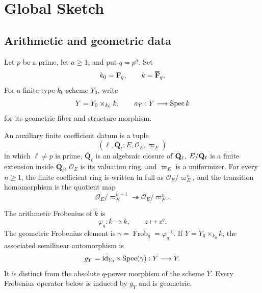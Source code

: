 \newcommand{\Fbar}{\overline{\mathbf F}_q}
\newcommand{\Qlb}{\overline{\mathbf Q}_\ell}
\newcommand{\Zl}{\mathbf Z_\ell}
\newcommand{\RGamma}{R\Gamma}
\newcommand{\RGammac}{R\Gamma_c}
\newcommand{\Sh}{\operatorname{Sh}}
\newcommand{\Kar}{\operatorname{Kar}}
\newcommand{\Wt}{\operatorname{Wt}}

\chapter{Global Sketch}

\section{Arithmetic and geometric data}

\begin{definition}
\label{def:weil-base-field}


Let \(p\) be a prime, let \(a\geq1\), and put \(q=p^a\).  Set
\[
 k_0=\Fq,
 \qquad
 k=\Fbar,
\]
For a finite-type \(k_0\)-scheme \(Y_0\),
write
\[
 Y=Y_0\times_{k_0}k,
 \qquad
 a_Y:Y\longrightarrow\operatorname{Spec} k
\]
for its geometric fiber and structure morphism.
\end{definition}


\begin{definition}
\label{def:weil-finite-coefficient-datum}


An auxiliary finite coefficient datum is a tuple
\[
 (\ell,\Qlb;E,\mathcal O_E,\varpi_E)
\]
in which \(\ell\neq p\) is prime, \(\Qlb\) is an algebraic closure of
\(\mathbf Q_{\ell}\), \(E/\mathbf Q_{\ell}\) is a finite extension inside \(\Qlb\),
\(\mathcal O_E\) is its valuation ring, and \(\varpi_E\) is a uniformizer.
For every \(n\geq1\),
the finite coefficient ring is written in full as
\(\mathcal O_E/\varpi_E^n\), and the transition homomorphism is the quotient
map
\[
 \mathcal O_E/\varpi_E^{n+1}\twoheadrightarrow
 \mathcal O_E/\varpi_E^n.
\]
\end{definition}


\begin{definition}
\label{def:weil-frobenius}


The arithmetic Frobenius of \(k\) is
\[
 \varphi_q:k\longrightarrow k,
 \qquad z\longmapsto z^q.
\]
The geometric Frobenius element is
\(\gamma=\operatorname{Frob}_q=\varphi_q^{-1}\).  If
\(Y=Y_0\times_{k_0}k\), the associated semilinear automorphism is
\[
 g_Y=\operatorname{id}_{Y_0}\times\operatorname{Spec}(\gamma):Y\longrightarrow Y.
\]
It is distinct from the absolute \(q\)-power morphism of the scheme \(Y\).
Every Frobenius operator below is induced by \(g_Y\) and is geometric.
\end{definition}

